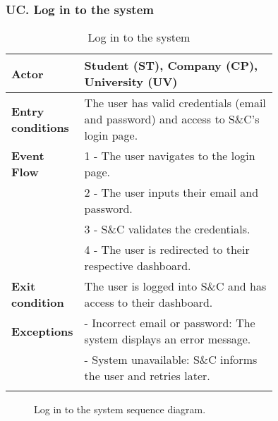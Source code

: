 \subsubsection*{UC\cuc . Log in to the system}
\begin{center}
    \begin{longtable}{|l|p{0.75\linewidth}|}
        \hline
        \textbf{Actor}            & Student (ST), Company (CP), University (UV) \\
        \hline
        \textbf{Entry conditions} & The user has valid credentials (email and password) and access to S\&C's login page. \\
        \hline
        \textbf{Event Flow}       & 1 - The user navigates to the login page. \\
                                  & 2 - The user inputs their email and password. \\
                                  & 3 - S\&C validates the credentials. \\
                                  & 4 - The user is redirected to their respective dashboard. \\
        \hline
        \textbf{Exit condition}   & The user is logged into S\&C and has access to their dashboard. \\       
        \hline
        \textbf{Exceptions}       & - Incorrect email or password: The system displays an error message. \\
                                  & - System unavailable: S\&C informs the user and retries later. \\
        \hline
        \caption{Log in to the system}
        \label{tab:login_usecase}
    \end{longtable}
\end{center}

\begin{figure}[H]
    \begin{center}
        
        \caption{Log in to the system sequence diagram.}
        \label{fig:login_seqd}%
    \end{center}
\end{figure}

